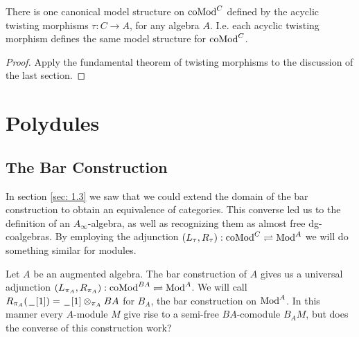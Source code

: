 \documentclass[../thesis.tex]{subfiles}
\begin{document}
            \begin{corollary}
                There is one canonical model structure on $\tt{coMod}^C$ defined by the acyclic twisting morphisms $\tau : C \rightarrow A$, for any algebra $A$. I.e. each acyclic twisting morphism defines the same model structure for $\tt{coMod}^C$. 
            \end{corollary}

            \begin{proof}
                Apply the fundamental theorem of twisting morphisms to the discussion of the last section.
            \end{proof}

    \section{Polydules}
        \subsection{The Bar Construction}
            In section \ref{sec: 1.3} we saw that we could extend the domain of the bar construction to obtain an equivalence of categories. This converse led us to the definition of an $A_\infty$-algebra, as well as recognizing them as almost free dg-coalgebras. By employing the adjunction $(L_\tau, R_\tau) : \tt{coMod}^C \rightleftharpoons \tt{Mod}^A$ we will do something similar for modules.

            Let $A$ be an augmented algebra. The bar construction of $A$ gives us a universal adjunction $(L_{\pi_A}, R_{\pi_A}) : \tt{coMod}^{BA} \rightleftharpoons \tt{Mod}^A$. We will call $R_{\pi_A}(\argument [1]) = \argument [1]\otimes_{\pi_A}BA$ for $B_A$, the bar construction on $\tt{Mod}^A$. In this manner every $A$-module $M$ give rise to a semi-free $BA$-comodule $B_AM$, but does the converse of this construction work?
\end{document}
